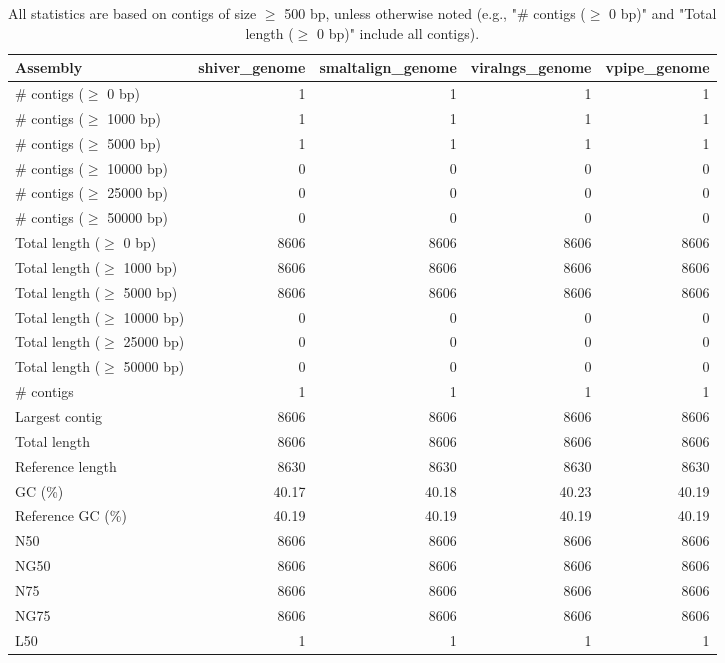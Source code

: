 \documentclass[12pt,a4paper]{article}
\begin{document}
\begin{table}[ht]
\begin{center}
\caption{All statistics are based on contigs of size $\geq$ 500 bp, unless otherwise noted (e.g., "\# contigs ($\geq$ 0 bp)" and "Total length ($\geq$ 0 bp)" include all contigs).}
\begin{tabular}{|l*{4}{|r}|}
\hline
Assembly & shiver\_genome & smaltalign\_genome & viralngs\_genome & vpipe\_genome \\ \hline
\# contigs ($\geq$ 0 bp) & 1 & 1 & 1 & 1 \\ \hline
\# contigs ($\geq$ 1000 bp) & 1 & 1 & 1 & 1 \\ \hline
\# contigs ($\geq$ 5000 bp) & 1 & 1 & 1 & 1 \\ \hline
\# contigs ($\geq$ 10000 bp) & 0 & 0 & 0 & 0 \\ \hline
\# contigs ($\geq$ 25000 bp) & 0 & 0 & 0 & 0 \\ \hline
\# contigs ($\geq$ 50000 bp) & 0 & 0 & 0 & 0 \\ \hline
Total length ($\geq$ 0 bp) & 8606 & 8606 & 8606 & 8606 \\ \hline
Total length ($\geq$ 1000 bp) & 8606 & 8606 & 8606 & 8606 \\ \hline
Total length ($\geq$ 5000 bp) & 8606 & 8606 & 8606 & 8606 \\ \hline
Total length ($\geq$ 10000 bp) & 0 & 0 & 0 & 0 \\ \hline
Total length ($\geq$ 25000 bp) & 0 & 0 & 0 & 0 \\ \hline
Total length ($\geq$ 50000 bp) & 0 & 0 & 0 & 0 \\ \hline
\# contigs & 1 & 1 & 1 & 1 \\ \hline
Largest contig & 8606 & 8606 & 8606 & 8606 \\ \hline
Total length & 8606 & 8606 & 8606 & 8606 \\ \hline
Reference length & 8630 & 8630 & 8630 & 8630 \\ \hline
GC (\%) & 40.17 & 40.18 & 40.23 & 40.19 \\ \hline
Reference GC (\%) & 40.19 & 40.19 & 40.19 & 40.19 \\ \hline
N50 & 8606 & 8606 & 8606 & 8606 \\ \hline
NG50 & 8606 & 8606 & 8606 & 8606 \\ \hline
N75 & 8606 & 8606 & 8606 & 8606 \\ \hline
NG75 & 8606 & 8606 & 8606 & 8606 \\ \hline
L50 & 1 & 1 & 1 & 1 \\ \hline

\end{tabular}
\end{center}
\end{table}
\end{document}
